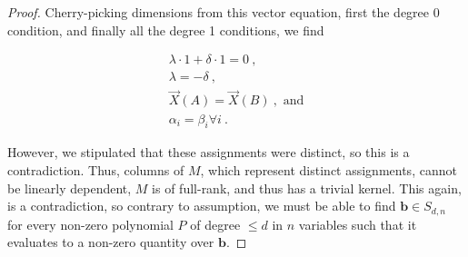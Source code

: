 \begin{proof}
        Cherry-picking dimensions from this vector equation, first the degree 0
        condition, and finally all the degree 1 conditions, we find

        \begin{gather*}
            \lambda\cdot 1 + \delta\cdot 1 = 0~, \\ 
            \lambda = -\delta~,\\
            \vec{X}(A) = \vec{X}(B)~, \text{ and}\\
            \alpha_i = \beta_i \forall i~.
        \end{gather*}

        However, we stipulated that these assignments were distinct, so this is
        a contradiction. Thus, columns of \(M\), which represent distinct
        assignments, cannot be linearly dependent, \(M\) is of full-rank, and
        thus has a trivial kernel. This again, is a contradiction, so contrary
        to assumption, we must be able to find \(\mathbf{b} \in S_{d, n}\) for
        every non-zero polynomial \(P\) of degree \(\leq d\) in \(n\) variables
        such that it evaluates to a non-zero quantity over \(\mathbf{b}\).
    
\end{proof}







